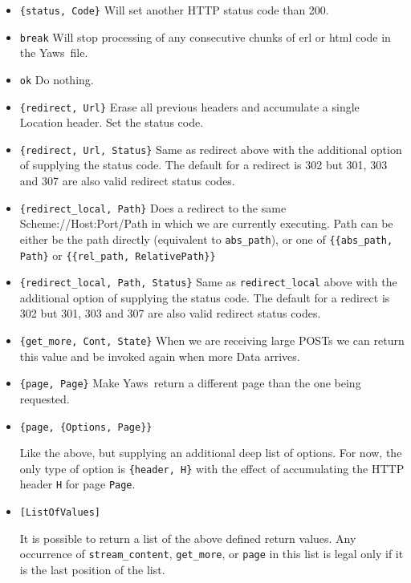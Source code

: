 \documentclass[11pt,oneside,english]{book}
\newcommand{\Yaws}            %
        {{\sc Yaws}}
\begin{document}
\begin{itemize}
\item       \verb+{status, Code}+
              Will set another HTTP status code than 200.

\item       \verb+break+  Will stop processing of any consecutive  chunks  of
              erl or html code in the \Yaws\  file.

\item       \verb+ok+     Do nothing.

\item       \verb+{redirect, Url}+
              Erase  all previous headers and accumulate a single
              Location header. Set the status code.

\item       \verb+{redirect, Url, Status}+
              Same as redirect above with the additional
	      option of supplying the status code. The default
	      for a redirect is 302 but 301, 303 and 307 are also
	      valid redirect status codes.

\item       \verb+{redirect_local, Path}+
              Does a redirect to the same Scheme://Host:Port/Path in
              which we are currently executing. Path can be either be
              the path directly (equivalent to \verb+abs_path+), or
              one of \verb+{{abs_path, Path}+ or
              \verb+{{rel_path, RelativePath}}+

\item       \verb+{redirect_local, Path, Status}+
              Same as \verb+redirect_local+ above with the additional
	      option of supplying the status code. The default
	      for a redirect is 302 but 301, 303 and 307 are also
	      valid redirect status codes.

\item       \verb+{get_more, Cont, State}+
              When  we  are  receiving  large POSTs we can return
              this value and be  invoked  again  when  more  Data
              arrives.

\item       \verb+{page, Page}+
              Make \Yaws\  return a different page than the one being
              requested.

\item       \verb+{page, {Options, Page}}+

              Like the above, but supplying an additional deep list of
              options.  For now, the only type of option is
              \verb+{header, H}+ with the effect of accumulating the
              HTTP header \verb+H+ for page \verb+Page+.

\item       \verb+[ListOfValues]+

              It is possible to return a list of the above defined
              return values.  Any occurrence of \verb+stream_content+,
              \verb+get_more+, or \verb+page+ in this list is legal
              only if it is the last position of the list.

\end{itemize}
\end{document}
